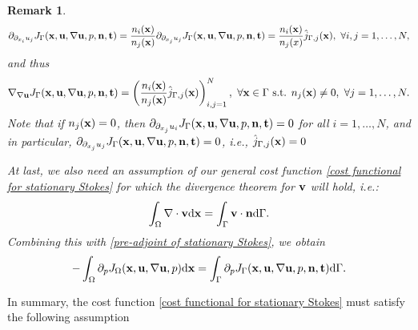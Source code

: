 \documentclass[oneside]{book}
\numberwithin{equation}{section}
\newtheorem{remark}{Remark}[section]
\begin{document}
\begin{itemize}
\begin{remark}
        \begin{align*}
            \partial_{\partial_{x_i}u_j}J_\Gamma({\bf x},{\bf u},\nabla{\bf u},p,{\bf n},{\bf t}) = \frac{n_i({\bf x})}{n_j({\bf x})}\partial_{\partial_{x_j}u_j}J_\Gamma({\bf x},{\bf u},\nabla{\bf u},p,{\bf n},{\bf t}) = \frac{n_i({\bf x})}{n_j({\bf }x)}\hat{j}_{\Gamma,j}({\bf x}),\ \forall i,j = 1,\ldots,N,
        \end{align*}
        and thus
        \begin{align*}
            \nabla_{\nabla{\bf u}}J_\Gamma({\bf x},{\bf u},\nabla{\bf u},p,{\bf n},{\bf t}) = \left(\frac{n_i({\bf x})}{n_j({\bf x})}\hat{j}_{\Gamma,j}({\bf x})\right)_{i,j=1}^N,\ \forall{\bf x}\in\Gamma \mbox{ s.t. } n_j({\bf x})\ne 0,\ \forall j = 1,\ldots,N.
        \end{align*}
        Note that if $n_j({\bf x}) = 0$, then $\partial_{\partial_{x_j}u_i}J_\Gamma({\bf x},{\bf u},\nabla{\bf u},p,{\bf n},{\bf t}) = 0$ for all $i = 1,\ldots,N$, and in particular, $\partial_{\partial_{x_j}u_j}J_\Gamma({\bf x},{\bf u},\nabla{\bf u},p,{\bf n},{\bf t}) = 0$, i.e., $\hat{j}_{\Gamma,j}({\bf x}) = 0$
        
        At last, we also need an assumption of our general cost function \eqref{cost functional for stationary Stokes} for which the divergence theorem for ${\bf v}$ will hold, i.e.:
        \begin{align*}
            \int_\Omega \nabla\cdot{\bf v}{\rm d}{\bf x} = \int_\Gamma {\bf v}\cdot{\bf n}{\rm d}\Gamma.
        \end{align*}
        Combining this with \eqref{pre-adjoint of stationary Stokes}, we obtain
        \begin{align*}
            -\int_\Omega \partial_pJ_\Omega({\bf x},{\bf u},\nabla{\bf u},p){\rm d}{\bf x} = \int_\Gamma \partial_pJ_\Gamma({\bf x},{\bf u},\nabla{\bf u},p,{\bf n},{\bf t}){\rm d}\Gamma.
        \end{align*}
    \end{remark}    
    In summary, the cost function \eqref{cost functional for stationary Stokes} must satisfy the following assumption
    

\end{itemize}
\end{document}
